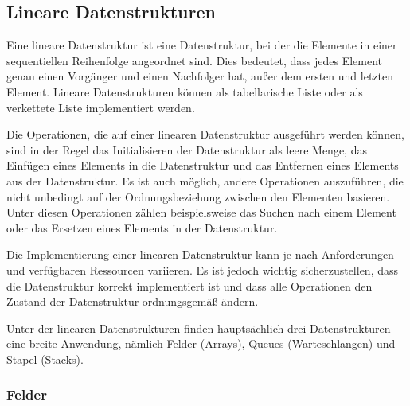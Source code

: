 \subsection{Lineare Datenstrukturen}
Eine lineare Datenstruktur ist eine Datenstruktur, bei der die Elemente in einer sequentiellen Reihenfolge angeordnet sind. Dies bedeutet, dass jedes Element genau einen Vorgänger und einen Nachfolger hat, außer dem ersten und letzten Element. Lineare Datenstrukturen können als tabellarische Liste oder als verkettete Liste implementiert werden. \autocite[314-315]{hoffmann_einfuhrung_2011}

Die Operationen, die auf einer linearen Datenstruktur ausgeführt werden können, sind in der Regel das Initialisieren der Datenstruktur als leere Menge, das Einfügen eines Elements in die Datenstruktur und das Entfernen eines Elements aus der Datenstruktur. Es ist auch möglich, andere Operationen auszuführen, die nicht unbedingt auf der Ordnungsbeziehung zwischen den Elementen basieren. Unter diesen Operationen zählen beispielsweise das Suchen nach einem Element oder das Ersetzen eines Elements in der Datenstruktur. \autocite[314-315]{hoffmann_einfuhrung_2011}

Die Implementierung einer linearen Datenstruktur kann je nach Anforderungen und verfügbaren Ressourcen variieren. Es ist jedoch wichtig sicherzustellen, dass die Datenstruktur korrekt implementiert ist und dass alle Operationen den Zustand der Datenstruktur ordnungsgemäß ändern. \autocite[314-315]{hoffmann_einfuhrung_2011}

Unter der linearen Datenstrukturen finden hauptsächlich drei Datenstrukturen eine breite Anwendung, nämlich Felder (Arrays), Queues (Warteschlangen) und Stapel (Stacks).

\subsubsection{Felder}

